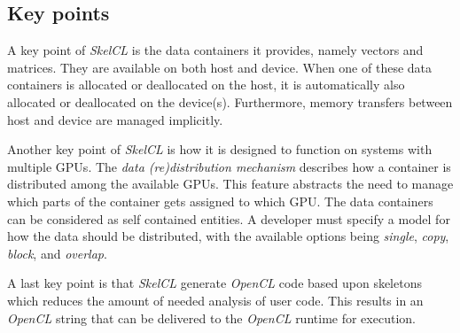 \subsection{Key points}
A key point of \textit{SkelCL} is the data containers it provides, namely vectors and matrices. They are available on both host and device. When one of these data containers is allocated or deallocated on the host, it is automatically also allocated or deallocated on the device(s). Furthermore, memory transfers between host and device are managed implicitly.

Another key point of \textit{SkelCL} is how it is designed to function on systems with multiple GPUs. The \textit{data (re)distribution mechanism} describes how a container is distributed among the available GPUs. This feature abstracts the need to manage which parts of the container gets assigned to which GPU. The data containers can be considered as self contained entities. A developer must specify a model for how the data should be distributed, with the available options being \textit{single}, \textit{copy}, \textit{block}, and \textit{overlap}.

A last key point is that \textit{SkelCL} generate \textit{OpenCL} code based upon skeletons which reduces the amount of needed analysis of user code. This results in an \textit{OpenCL} string that can be delivered to the \textit{OpenCL} runtime for execution.